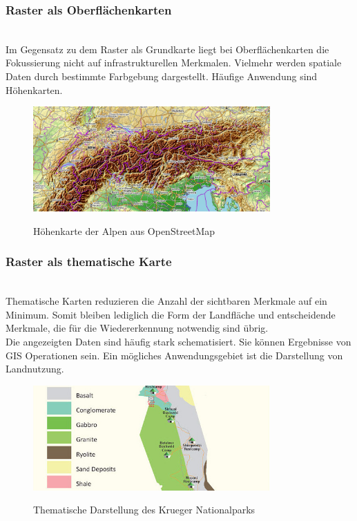 \documentclass[10pt,conference,compsocconf]{IEEEtran}
\begin{document}
\subsubsection{Raster als Oberflächenkarten}\hspace*{\fill} \\
Im Gegensatz zu dem Raster als Grundkarte liegt bei Oberflächenkarten die Fokussierung nicht auf infrastrukturellen Merkmalen. Vielmehr werden spatiale Daten durch bestimmte Farbgebung dargestellt. Häufige Anwendung sind Höhenkarten.
\begin{figure}[H]
  \centering
  	\includegraphics[height=114pt]{img/gis_alps}\\
  \caption[]{Höhenkarte der Alpen aus OpenStreetMap}
  \label{img:gis_alps}
\end{figure}

\subsubsection{Raster als thematische Karte}\hspace*{\fill} \\
Thematische Karten reduzieren die Anzahl der sichtbaren Merkmale auf ein Minimum. Somit bleiben lediglich die Form der Landfläche und entscheidende Merkmale, die für die Wiedererkennung notwendig sind übrig.\\
Die angezeigten Daten sind häufig stark schematisiert. Sie können Ergebnisse von GIS Operationen sein. Ein mögliches Anwendungsgebiet ist die Darstellung von Landnutzung. 
\begin{figure}[H]
  \centering
  	\includegraphics[height=114pt]{img/gis_thematisch}\\
  \caption[]{Thematische Darstellung des Krueger Nationalparks\footnotemark}
  \label{img:gis_thematisch}
\end{figure}
\end{document}

